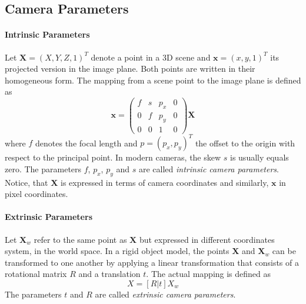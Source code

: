 \subsection{Camera Parameters}
\paragraph{Intrinsic Parameters} Let $\textbf{X} = (X,Y,Z,1)^T$ denote a point in a 3D scene and $\textbf{x} = (x,y,1)^T$ its projected version in the image plane. Both points are written in their homogeneous form. The mapping from a scene point to the image plane is defined as
\begin{equation}
\textbf{x} = 
\begin{pmatrix}
f & s & p_x & 0 \\
0 & f & p_y & 0 \\
0 & 0 & 1 & 0
\end{pmatrix}
\textbf{X}
\end{equation}
where $f$ denotes the focal length and $p = (p_x, p_y)^T$ the offset to the origin with respect to the principal point. In modern cameras, the skew $s$ is usually equals zero. The parameters $f$, $p_x$, $p_y$ and $s$ are called \textit{intrinsic camera parameters}. Notice, that $\textbf{X}$ is expressed in terms of camera coordinates and similarly, $\textbf{x}$ in pixel coordinates.
\paragraph{Extrinsic Parameters} Let $\textbf{X}_w$ refer to the same point as $\textbf{X}$ but expressed in different coordinates system, in the world space. In a rigid object model, the points $\textbf{X}$ and $\textbf{X}_w$ can be transformed to one another by applying a linear transformation that consists of a rotational matrix $R$ and a translation $t$. The actual mapping is defined as
\begin{equation}
	X = \left[ R | t \right] X_w
\end{equation}
The parameters $t$ and $R$ are called \textit{extrinsic camera parameters}.


